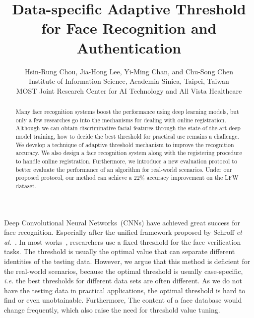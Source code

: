 \documentclass[10pt,twocolumn]{article}
\begin{document}
\title{Data-specific Adaptive Threshold for Face Recognition and Authentication}
       
\author{Hsin-Rung Chou, Jia-Hong Lee, Yi-Ming Chan, and Chu-Song Chen\\
Institute of Information Science, Academia Sinica, Taipei, Taiwan\\
MOST Joint Research Center for AI Technology and All Vista Healthcare\\

}

\maketitle
\thispagestyle{empty}

\begin{abstract}
Many face recognition systems boost the performance using deep learning models, but only a few researches go into the mechanisms for dealing with online registration. Although we can obtain discriminative facial features through the state-of-the-art deep model training, how to decide the best threshold for practical use remains a challenge. We develop a technique of adaptive threshold mechanism to improve the recognition accuracy. We also design a face recognition system along with the registering procedure to handle online registration. Furthermore, we introduce a new evaluation protocol to better evaluate the performance of an algorithm for real-world scenarios. Under our proposed protocol, our method can achieve a 22\% accuracy improvement on the LFW dataset.
\end{abstract}

Deep Convolutional Neural Networks~(CNNs) have achieved great success for face recognition. Especially after the unified framework proposed by Schroff \textit{et al.}~\cite{schroff2015facenet}.
In most works~\cite{chen2018mobilefacenets,parkhi2015deep,schroff2015facenet}, researchers use a fixed threshold for the face verification tasks. The threshold is usually the optimal value that can separate different identities of the testing data. However, we argue that this method is deficient for the real-world scenarios, because the optimal threshold is usually case-specific, \textit{i.e.} the best thresholds for different data sets are often different. As we do not have the testing data in practical applications, the optimal threshold is hard to find or even unobtainable. Furthermore, The content of a face database would change frequently, which also raise the need for threshold value tuning.
\end{document}
